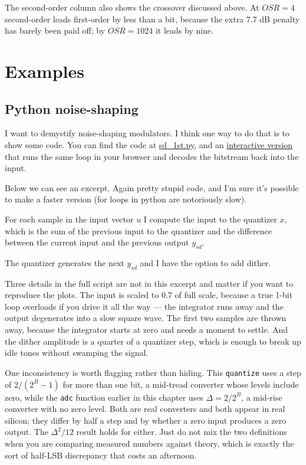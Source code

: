 The second-order column also shows the crossover discussed above. At
\(OSR=4\) second-order leads first-order by less than a bit, because the
extra 7.7 dB penalty has barely been paid off; by \(OSR=1024\) it leads
by nine.

\section{Examples}\label{examples}

\subsection{Python noise-shaping}\label{python-noise-shaping}

I want to demystify noise-shaping modulators. I think one way to do that
is to show some code. You can find the code at
\href{https://github.com/wulffern/aic2026/blob/main/ex/sd_1st.py}{sd\_1st.py},
and an
\href{https://wulffern.github.io/aic2026/assets/examples/sigma-delta.html}{interactive
version} that runs the same loop in your browser and decodes the
bitstream back into the input.

Below we can see an excerpt. Again pretty stupid code, and I'm sure it's
possible to make a faster version (for loops in python are notoriously
slow).

For each sample in the input vector \(u\) I compute the input to the
quantizer \(x\), which is the sum of the previous input to the quantizer
and the difference between the current input and the previous output
\(y_{sd}\).

The quantizer generates the next \(y_{sd}\) and I have the option to add
dither.

Three details in the full script are not in this excerpt and matter if
you want to reproduce the plots. The input is scaled to 0.7 of full
scale, because a true 1-bit loop overloads if you drive it all the way
--- the integrator runs away and the output degenerates into a slow
square wave. The first two samples are thrown away, because the
integrator starts at zero and needs a moment to settle. And the dither
amplitude is a quarter of a quantizer step, which is enough to break up
idle tones without swamping the signal.

One inconsistency is worth flagging rather than hiding. This
\texttt{quantize} uses a step of \(2/(2^B-1)\) for more than one bit, a
mid-tread converter whose levels include zero, while the \texttt{adc}
function earlier in this chapter uses \(\Delta = 2/2^B\), a mid-rise
converter with no zero level. Both are real converters and both appear
in real silicon; they differ by half a step and by whether a zero input
produces a zero output. The \(\Delta^2/12\) result holds for either.
Just do not mix the two definitions when you are comparing measured
numbers against theory, which is exactly the sort of half-LSB
discrepancy that costs an afternoon.

